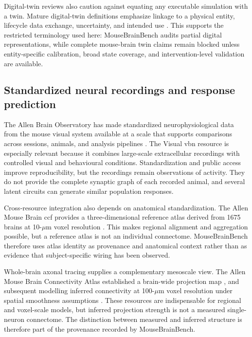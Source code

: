 Digital-twin reviews also caution against equating any executable simulation
with a twin. Mature digital-twin definitions emphasize linkage to a physical
entity, lifecycle data exchange, uncertainty, and intended use
\citep{jones2020digitaltwin,rasheed2020digitaltwin,fuller2020digitaltwin,shao2022credibility}.
This supports the restricted terminology used here: MouseBrainBench audits
partial digital representations, while complete mouse-brain twin claims remain
blocked unless entity-specific calibration, broad state coverage, and
intervention-level validation are available.


\subsection{Standardized neural recordings and response prediction}
\label{subsec:recordings-prediction}

The Allen Brain Observatory has made standardized neurophysiological data from
the mouse visual system available at a scale that supports comparisons across
sessions, animals, and analysis pipelines \citep{siegle2021survey}. The Visual
\ac{vbn} resource is especially relevant because it combines
large-scale extracellular recordings with controlled visual and behavioural
conditions. Standardization and public access improve reproducibility, but the
recordings remain observations of activity. They do not provide the complete
synaptic graph of each recorded animal, and several latent circuits can generate
similar population responses.

Cross-resource integration also depends on anatomical standardization. The Allen
Mouse Brain \ac{ccf} provides a three-dimensional reference
atlas derived from 1675 brains at 10-$\mu$m voxel resolution
\citep{wang2020ccf}. This makes regional alignment and aggregation possible,
but a reference atlas is not an individual connectome. MouseBrainBench therefore
uses atlas identity as provenance and anatomical context rather than as evidence
that subject-specific wiring has been observed.

Whole-brain axonal tracing supplies a complementary mesoscale view. The Allen
Mouse Brain Connectivity Atlas established a brain-wide projection map
\citep{oh2014mesoscale}, and subsequent modelling inferred connectivity at
100-$\mu$m voxel resolution under spatial smoothness assumptions
\citep{knox2019connectome}. These resources are indispensable for regional and
voxel-scale models, but inferred projection strength is not a measured
single-neuron connectome. The distinction between measured and inferred
structure is therefore part of the provenance recorded by MouseBrainBench.

